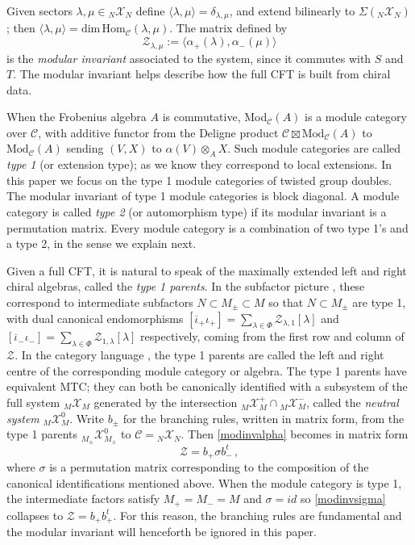 \documentclass[12pt]{article}
\numberwithin{equation}{section}
\def\cC            {{\mathcal{C}}}
\def\cZ            {{\mathcal{Z}}}
\def\MXM           {{}_M {\mathcal{X}}_M}
\def\MXMp          {{}_M^{} {\mathcal{X}}_M^+}
\def\MXMm          {{}_M^{} {\mathcal{X}}_M^-}
\def\NXN           {{}_N {\mathcal{X}}_N}
\begin{document}
 Given sectors $\lambda,\mu\in\NXN$ define $\langle \lambda,\mu\rangle=\delta_{\lambda,\mu}$, and extend bilinearly to $\Sigma(\NXN)$;
 then  $\langle \lambda,\mu\rangle=\mathrm{dim \,Hom}_\cC(\lambda,\mu)$.  
 The matrix defined by\begin{equation}\label{modinvalpha}\cZ_{\lambda,\mu}:=\langle \alpha_+(\lambda),\alpha_-(\mu)\rangle\end{equation}
is the \textit{modular invariant} associated to the system, since it commutes with $S$ and $T$.
The {modular invariant} helps describe how the full CFT is built from chiral data.

When the Frobenius algebra $A$ is commutative, Mod$_\cC(A)$ is a module category over $\cC$,
with additive functor from the Deligne product $\cC\boxtimes \mathrm{Mod}_\cC(A)$ to $\mathrm{Mod}_\cC(A)$ sending $(V,X)$ to $\alpha(V)\otimes_A X$. Such module categories are called \textit{type 1} (or extension type); as we know they correspond to local extensions. In this paper we focus on the type 1 module categories of twisted group doubles. The  modular invariant of {type 1} module categories is block diagonal. A module category is called \textit{type 2} (or automorphism type)  if its modular invariant is a permutation matrix. 
Every module category is a combination of two type 1's and a type 2, in the sense we explain next.

Given a full CFT, it is natural to speak of the maximally extended left and right chiral algebras, called the \textit{type 1 parents}.  In the subfactor picture \cite{BE4}, these correspond to intermediate subfactors
$N\subset M_{\pm}\subset M$ so that $N\subset M_\pm$ are type 1, with dual canonical endomorphisms
$[\overline{\iota}_+\iota_+]=\sum_{\lambda\in\Phi}\cZ_{\lambda,1}[\lambda]$ and  
$[\overline{\iota}_-\iota_-]=\sum_{\lambda\in\Phi}\cZ_{1,\lambda}[\lambda]$ respectively, coming
from the first row and column of $\cZ$. {In the category language \cite{FFRS}, the type 1 parents are called the left and right centre of the corresponding module category or algebra.} The type 1 parents have equivalent MTC; they can both be canonically identified with a subsystem of the full system $\MXM$ generated by the intersection {$\MXMp\cap\MXMm$},  called the \textit{neutral system} $\MXM^0$.
Write $b_\pm$ for the branching rules, written in matrix form,  from the type 1 parents  ${}_{M_\pm}\mathcal{X}_{M_\pm}^0$ to {$\cC=\NXN$}.
Then \eqref{modinvalpha} becomes in matrix form
\begin{equation}\cZ=b_+\sigma b_-^t\,,\label{modinvsigma}\end{equation}
 where  $\sigma$ is a permutation matrix corresponding to the composition of the canonical identifications mentioned above. When the module category  is type 1, the intermediate factors satisfy $M_+=M_-=M$ and $\sigma=id$ so \eqref{modinvsigma} collapses to $\cZ=b_+b_+^t$.
 For this reason, the branching rules are fundamental and  the modular invariant will henceforth be ignored in this paper.
\end{document}

